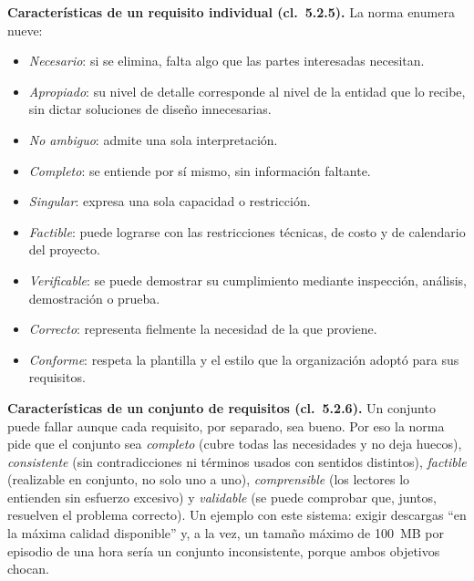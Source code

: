 \documentclass[11pt,a4paper]{article}
\newcommand{\cl}[1]{cl.~#1}
\begin{document}
\textbf{Caracter\'isticas de un requisito individual (\cl{5.2.5}).} La norma enumera nueve:
\begin{itemize}
  \item \emph{Necesario}: si se elimina, falta algo que las partes interesadas necesitan.
  \item \emph{Apropiado}: su nivel de detalle corresponde al nivel de la entidad que lo recibe, sin dictar soluciones de dise\~no innecesarias.
  \item \emph{No ambiguo}: admite una sola interpretaci\'on.
  \item \emph{Completo}: se entiende por s\'i mismo, sin informaci\'on faltante.
  \item \emph{Singular}: expresa una sola capacidad o restricci\'on.
  \item \emph{Factible}: puede lograrse con las restricciones t\'ecnicas, de costo y de calendario del proyecto.
  \item \emph{Verificable}: se puede demostrar su cumplimiento mediante inspecci\'on, an\'alisis, demostraci\'on o prueba.
  \item \emph{Correcto}: representa fielmente la necesidad de la que proviene.
  \item \emph{Conforme}: respeta la plantilla y el estilo que la organizaci\'on adopt\'o para sus requisitos.
\end{itemize}

\textbf{Caracter\'isticas de un conjunto de requisitos (\cl{5.2.6}).} Un conjunto puede fallar aunque cada requisito, por separado, sea bueno. Por eso la norma pide que el conjunto sea \emph{completo} (cubre todas las necesidades y no deja huecos), \emph{consistente} (sin contradicciones ni t\'erminos usados con sentidos distintos), \emph{factible} (realizable en conjunto, no solo uno a uno), \emph{comprensible} (los lectores lo entienden sin esfuerzo excesivo) y \emph{validable} (se puede comprobar que, juntos, resuelven el problema correcto). Un ejemplo con este sistema: exigir descargas ``en la m\'axima calidad disponible'' y, a la vez, un tama\~no m\'aximo de 100~MB por episodio de una hora ser\'ia un conjunto inconsistente, porque ambos objetivos chocan.
\end{document}
